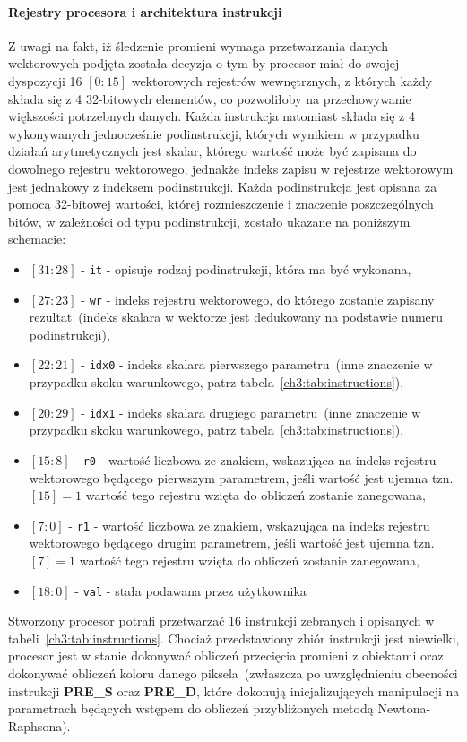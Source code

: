 \paragraph{Rejestry procesora i architektura instrukcji}
Z uwagi na fakt, iż śledzenie promieni wymaga przetwarzania danych wektorowych podjęta została decyzja o tym by procesor miał do swojej dyspozycji 16 $[0:15]$ wektorowych rejestrów wewnętrznych, z których każdy składa się z 4 32-bitowych elementów, co pozwoliłoby na przechowywanie większości potrzebnych danych. Każda instrukcja natomiast składa się z 4 wykonywanych jednocześnie podinstrukcji, których wynikiem w przypadku działań arytmetycznych jest skalar, którego wartość może być zapisana  do dowolnego rejestru wektorowego, jednakże indeks zapisu w rejestrze wektorowym jest jednakowy z indeksem podinstrukcji. Każda podinstrukcja jest opisana za pomocą 32-bitowej wartości, której rozmieszczenie i znaczenie poszczególnych bitów, w zależności od typu podinstrukcji, zostało ukazane na poniższym schemacie:
\begin{itemize}
\item[] $[31:28]$ - \texttt{it} - opisuje rodzaj podinstrukcji, która ma być wykonana,
\item[] $[27:23]$ - \texttt{wr} - indeks rejestru wektorowego, do którego zostanie zapisany rezultat~(indeks skalara w wektorze jest dedukowany na podstawie numeru podinstrukcji),
\item[] $[22:21]$ - \texttt{idx0} - indeks skalara pierwszego parametru~(inne znaczenie w przypadku skoku warunkowego, patrz tabela~\ref{ch3:tab:instructions}),
\item[] $[20:29]$ - \texttt{idx1} - indeks skalara drugiego parametru~(inne znaczenie w przypadku skoku warunkowego, patrz tabela~\ref{ch3:tab:instructions}),
\item[] $[15:8]$ - \texttt{r0} - wartość liczbowa ze znakiem, wskazująca na indeks rejestru wektorowego będącego pierwszym parametrem, jeśli wartość jest ujemna tzn. $[15]=1$ wartość tego rejestru wzięta do obliczeń zostanie zanegowana,
\item[] $[7:0]$ - \texttt{r1} - wartość liczbowa ze znakiem, wskazująca na indeks rejestru wektorowego będącego drugim parametrem, jeśli wartość jest ujemna tzn. $[7]=1$ wartość tego rejestru wzięta do obliczeń zostanie zanegowana,
\item[] $[18:0]$ - \texttt{val} - stała podawana przez użytkownika
\end{itemize}
Stworzony procesor potrafi przetwarzać 16 instrukcji zebranych i opisanych w tabeli~\ref{ch3:tab:instructions}. Chociaż przedstawiony zbiór instrukcji jest niewielki, procesor jest w stanie dokonywać obliczeń przecięcia promieni z obiektami oraz dokonywać obliczeń koloru danego piksela~(zwłaszcza po uwzględnieniu obecności instrukcji \textbf{PRE\_S} oraz \textbf{PRE\_D}, które dokonują inicjalizujących manipulacji na parametrach będących wstępem do obliczeń przybliżonych metodą Newtona-Raphsona). 

